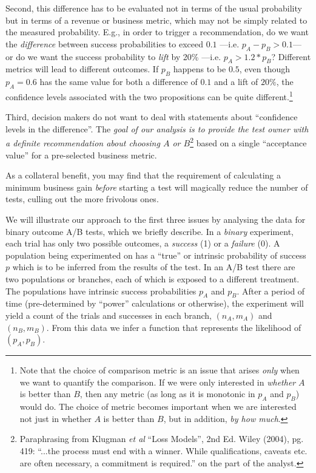 \documentclass[letterpaper,12pt]{article}
\begin{document}
Second, this difference has to be evaluated not in terms of the usual
probability but in terms of a revenue or business metric, which
may not be simply related to the measured probability. E.g., in
order to trigger a recommendation, do we want the {\em difference}
between success probabilities to exceed \(0.1\)
---i.e. \(p_A-p_B>0.1\)--- or do we want the success probability to
{\em lift} by 20\% ---i.e. \(p_A > 1.2*p_B\)? Different metrics will
lead to different outcomes. If \(p_B\) happens to be \(0.5\), even
though \(p_A=0.6\) has the same value for both a difference of
\(0.1\) and a lift of \(20\%\), the confidence levels associated with
the two propositions can be quite different.\footnote{Note that the
  choice of comparison metric is an issue that arises {\em only} when
  we want to quantify the comparison. If we were only interested in
  {\em whether} \(A\) is better than \(B\), then any metric (as long
  as it is monotonic in \(p_A\) and \(p_B\)) would do. The choice of
  metric becomes important when we are interested not just in whether
  \(A\) is better than \(B\), but in addition, {\em by how much}.}

Third, decision makers do not want to deal with statements about
``confidence levels in the difference''. The {\em goal of our analysis
  is to provide the test owner with a definite recommendation about
  choosing \(A\) or \(B\)}\footnote{Paraphrasing from Klugman {\em et
    al} ``Loss Models'', 2nd Ed. Wiley (2004), pg. 419: ``...the
  process must end with a winner. While qualifications, caveats
  etc. are often necessary, a commitment is required.'' on the part of the analyst.} based on a
single ``acceptance value'' for a pre-selected business metric.

As a collateral benefit, you may find that the requirement of
calculating a minimum business gain {\em before} starting a test will
magically reduce the number of tests, culling out the more frivolous
ones.

We will illustrate our approach to the first three issues by analysing
the data for binary outcome A/B tests, which we briefly describe.
In a
{\em binary} experiment, each trial has only two possible outcomes, a
{\em success} (1) or a {\em failure} (0).  A population being
experimented on has a ``true'' or intrinsic probability of success \(p\) which is
to be inferred from the results of the test.
In an A/B test there are two populations or branches, each of which is
exposed to a different treatment. The populations have intrinsic success
probabilities \(p_A\) and \(p_B\). After a period of time
(pre-determined by ``power'' calculations or otherwise), the
experiment will yield a count of the trials and successes in each
branch, \((n_A, m_A)\) and \((n_B, m_B)\). From this data we infer a
function that represents the likelihood of \((p_A,p_B)\).
\end{document}
